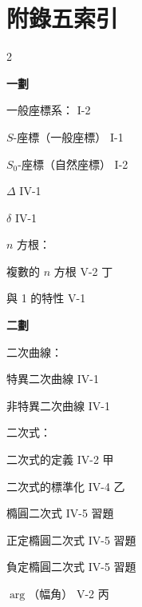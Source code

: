 \section*{附錄五\quad 索\qquad 引}
\label{sec:b4_a5}

\setlength{\columnsep}{2em}
\begin{multicols}{2}

\begin{center}
\textbf{\large 一\quad 劃}
\end{center}

\noindent 一般座標系： \hfill I-2\par
\noindent\hspace*{1.5em} $S$-座標（一般座標） \hfill I-1\par
\noindent\hspace*{1.5em} $S_0$-座標（自然座標） \hfill I-2\par
\noindent $\Delta$ \hfill IV-1\par
\noindent $\delta$ \hfill IV-1\par
\noindent $n$ 方根：\par
\noindent\hspace*{1.5em} 複數的 $n$ 方根 \hfill V-2 丁\par
{} 與 1 的特性 \hfill V-1\par

\vspace{0.8em}
\begin{center}
\textbf{\large 二\quad 劃}
\end{center}

\noindent 二次曲線：\par
\noindent\hspace*{1.5em} 特異二次曲線 \hfill IV-1\par
\noindent\hspace*{1.5em} 非特異二次曲線 \hfill IV-1\par
\noindent 二次式：\par
\noindent\hspace*{1.5em} 二次式的定義 \hfill IV-2 甲\par
\noindent\hspace*{1.5em} 二次式的標準化 \hfill IV-4 乙\par
\noindent\hspace*{1.5em} 橢圓二次式 \hfill IV-5 習題\par
\noindent\hspace*{1.5em} 正定橢圓二次式 \hfill IV-5 習題\par
\noindent\hspace*{1.5em} 負定橢圓二次式 \hfill IV-5 習題\par
\noindent $\arg$（幅角） \hfill V-2 丙\par


\end{multicols}
